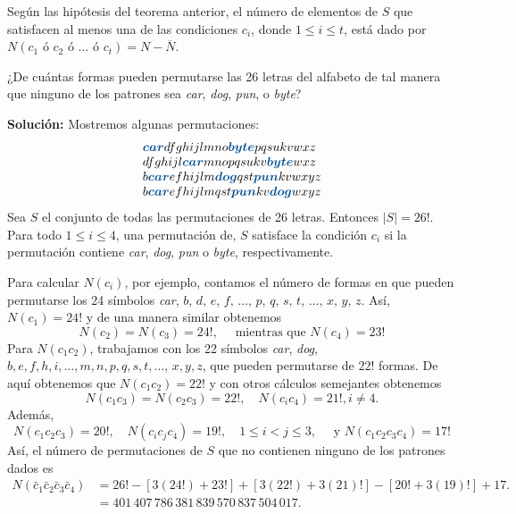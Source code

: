 \newpage

\begin{corollary}
    Según las hipótesis del teorema anterior, el número de elementos de $S$ que satisfacen al menos una de las condiciones $c_i$, donde $1 \leq i \leq t$, está dado por $N(c_1 \text{ ó } c_2 \text{ ó } \dots \text{ ó } c_t) = N - \overline{N}$.
\end{corollary}

\begin{myexample}
    ¿De cuántas formas pueden permutarse las 26 letras del alfabeto de tal manera que ninguno de los patrones sea \textit{car}, \textit{dog}, \textit{pun}, o \textit{byte}?

    \tcblower
    \textbf{\color{jblueleft}Solución:} Mostremos algunas permutaciones:
    $$\begin{array}{l}
        \bm{\textcolor{jblueleft}{car}}dfghijlmno\bm{\textcolor{jblueleft}{byte}}pqsukvwxz \\
        dfghijl\bm{\textcolor{jblueleft}{car}}mnopqsukv\bm{\textcolor{jblueleft}{byte}}wxz \\
        b\bm{\textcolor{jblueleft}{car}}efhijlm\bm{\textcolor{jblueleft}{dog}}qst\bm{\textcolor{jblueleft}{pun}}kvwxyz \\
        b\bm{\textcolor{jblueleft}{car}}efhijlmqst\bm{\textcolor{jblueleft}{pun}}kv\bm{\textcolor{jblueleft}{dog}}wxyz
    \end{array}$$
    Sea $S$ el conjunto de todas las permutaciones de 26 letras. Entonces $|S|=26!$. Para todo $1 \leq i \leq 4$, una permutación de, $S$ satisface la condición $c_i$ si la permutación contiene \textit{car}, \textit{dog}, \textit{pun} o \textit{byte}, respectivamente.
    
    Para calcular $N\left(c_i\right)$, por ejemplo, contamos el número de formas en que pueden permutarse los 24 símbolos \textit{car}, $b, \, d, \, e, \, f, \, \dots, \, p, \, q, \, s, \, t, \, \dots, \, x, \, y, \, z$. Así, $N\left(c_1\right)=24!$ y de una manera similar obtenemos
    $$N\left(c_2\right)=N\left(c_3\right)=24 !, \quad \text { mientras que } N\left(c_4\right)=23 !$$
    Para $N\left(c_1 c_2\right)$, trabajamos con los 22 símbolos \textit{car}, \textit{dog}, $b, e, f, h, i, \ldots, m, n, p, q, s, t, \ldots$, $x, y, z$, que pueden permutarse de $22!$ formas. De aquí obtenemos que $N\left(c_1 c_2\right)=22!$ y con otros cálculos semejantes obtenemos
    $$N\left(c_1 c_3\right)=N\left(c_2 c_3\right)=22 !, \quad N\left(c_i c_4\right)=21 !, i \neq 4 .$$
    Además,
    $$N\left(c_1 c_2 c_3\right)=20 !, \quad N\left(c_i c_j c_4\right)=19 !, \quad 1 \leq i<j \leq 3, \quad  \text{ y } N\left(c_1 c_2 c_3 c_4\right) = 17!$$
    Así, el número de permutaciones de $S$ que no contienen ninguno de los patrones dados es
    \begin{align*}
        N\left(\bar{c}_1 \bar{c}_2 \bar{c}_3 \bar{c}_4\right) & = 26 !-[3(24 !)+23 !]+[3(22 !)+3(21) !]-[20 !+3(19) !]+17. \\
        & = 401 \, 407 \, 786 \, 381 \, 839 \, 570 \, 837 \, 504 \, 017.
    \end{align*}
\end{myexample}

